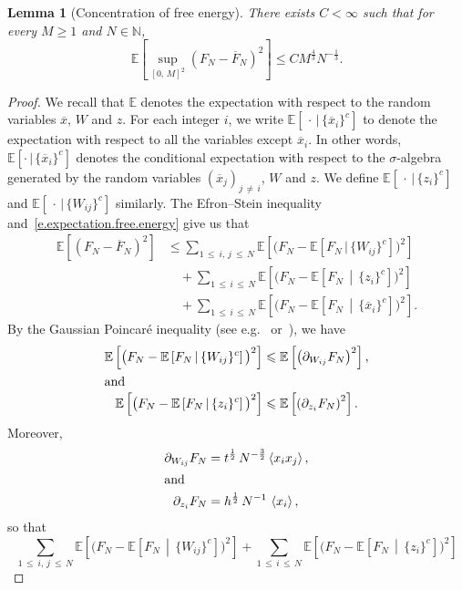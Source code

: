 \documentclass[10pt]{amsart}
\newtheorem{lemm}[theo]{Lemma}\newtheorem{prop}[theo]{Proposition}\newtheorem{coro}[theo]{Corollary}\newtheorem{conj}[theo]{Conjecture}
\theoremstyle{definition}\newtheorem{defi}[theo]{Definition}\newtheorem{rema}[theo]{Remark}\newtheorem{exam}[theo]{Example}\newtheorem{exem}[theo]{Example}\newtheorem{nota}[theo]{Notation}
\newcommand{\N}{\mathbb{N}}
\newcommand{\E}{\mathbb{E}}
\newcommand{\1}{\mathds{1}}
\renewcommand{\le}{\leqslant}
\renewcommand{\ge}{\geqslant}
\newcommand{\la}{\left\langle}
\newcommand{\ra}{\right\rangle}
\renewcommand{\bar}{\overline}
\begin{document}
\begin{lemm}[Concentration of free energy]\label{l.concentration}
There exists $C < \infty$ such that for every $M \ge 1$ and $N \in \N$,
\[
\E \left[\sup_{\left[0,\,M\right]^2} \left(F_N - \bar F_N \right)^2 \right] \le C M^\frac 4 3 N^{-\frac 1 3}.
\]
\end{lemm}
\begin{proof}
We recall that $\E$ denotes the expectation with respect to the random variables $\bar x$, $W$ and $z$. For each integer $i$, we write $\E[\,\cdot\,|\,\{\bar x_{i}\}^c]$ to denote the expectation with respect to all the variables except $\bar x_i$. In other words, $\E[\cdot\,|\,\{\bar x_{i}\}^c]$ denotes the conditional expectation with respect to the $\sigma$-algebra generated by the random variables $(\bar x_j)_{j\,\neq\,i}$, $W$ and $z$. We define $\E[\,\cdot\,|\,\{z_{i}\}^c]$ and $\E[\,\cdot\,|\,\{W_{ij}\}^c]$ similarly. The Efron--Stein inequality and~\eqref{e.expectation.free.energy} give us that
\begin{align*}
\E \left[\left(F_N - \bar F_N \right)^2 \right] & \le \sum_{1\,\le\: i,\,j\:\le\,N} \E \left[\big(F_N - \E\left[F_N\,|\,\{W_{ij}\}^c\right]\big)^2 \right]
\\
& \quad + \sum_{1\,\le\,i\,\le\,N} \E \left[\big(F_N - \E\left[F_N \,\middle|\, \{z_{i}\}^c\right]\big)^2 \right]
\\
& \quad + \sum_{1\,\le\,i\,\le\,N} \E \left[\big(F_N - \E\left[F_N\,\middle|\, \{\bar x_{i}\}^c\right]\big)^2 \right].
\end{align*}
By the Gaussian Poincaré inequality (see e.g.~\cite[(2.5)]{chatterjee} or~\cite{poincare}), we have
\begin{align*}
\E \left[\big(F_N - \E\left[F_N \, \middle| \, \{W_{ij}\}^c \right]\big)^2 \right] &\le \E \left[\left(\partial_{W_{ij}} F_N \right) ^2 \right],
\\
\intertext{and}
\E \left[\big(F_N - \E\left[F_N \, \middle| \, \{z_{i}\}^c\right]\big)^2 \right] &\le \E \left[\left(\partial_{z_i} F_N \right) ^2 \right].
\end{align*}
Moreover,
\begin{align*}
\partial_{W_{ij}} F_N &= t^\frac 1 2 \, N^{-\frac 3 2} \la x_i x_j \ra,
\\
\intertext{and}
\partial_{z_i} F_N &= h^\frac 1 2 \, N^{-1} \, \la x_i \ra,
\end{align*}
so that
\[
\sum_{1\,\le\:i,\,j\:\le\,N} \E \left[\big(F_N - \E[F_N \, \middle| \, \{W_{ij}\}^c]\big)^2 \right] +
\sum_{1\,\le\,i\,\le\,N} \E \left[\big(F_N - \E[F_N \, \middle| \, \{z_{i}\}^c]\big)^2 \right]
\]
\end{proof}
\end{document}
